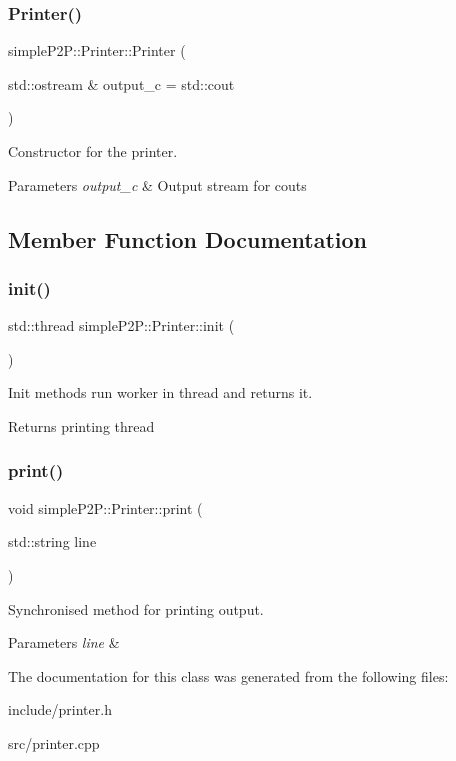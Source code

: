\subsubsection{\texorpdfstring{Printer()}{Printer()}}
{\footnotesize\ttfamily simple\+P2\+P\+::\+Printer\+::\+Printer (\begin{DoxyParamCaption}\item[{std\+::ostream \&}]{output\+\_\+c = {\ttfamily std\+:\+:cout} }\end{DoxyParamCaption})}



Constructor for the printer. 


\begin{DoxyParams}{Parameters}
{\em output\+\_\+c} & Output stream for couts \\
\hline
\end{DoxyParams}


\subsection{Member Function Documentation}
\mbox{\label{classsimpleP2P_1_1Printer_a9291e626c231334f26c305ab51e6cf19}} 
\subsubsection{\texorpdfstring{init()}{init()}}
{\footnotesize\ttfamily std\+::thread simple\+P2\+P\+::\+Printer\+::init (\begin{DoxyParamCaption}{ }\end{DoxyParamCaption})}



Init methods run worker in thread and returns it. 

\begin{DoxyReturn}{Returns}
printing thread 
\end{DoxyReturn}
\mbox{\label{classsimpleP2P_1_1Printer_a296b8acb2cf397eaab98087efd8959db}} 
\subsubsection{\texorpdfstring{print()}{print()}}
{\footnotesize\ttfamily void simple\+P2\+P\+::\+Printer\+::print (\begin{DoxyParamCaption}\item[{std\+::string}]{line }\end{DoxyParamCaption})}



Synchronised method for printing output. 


\begin{DoxyParams}{Parameters}
{\em line} & \\
\hline
\end{DoxyParams}


The documentation for this class was generated from the following files\+:\begin{DoxyCompactItemize}
\item 
include/printer.\+h\item 
src/printer.\+cpp\end{DoxyCompactItemize}
